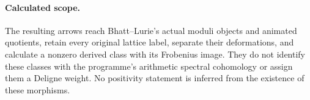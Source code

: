 \paragraph{Calculated scope.}
The resulting arrows reach Bhatt--Lurie's actual moduli
objects and animated quotients, retain every original lattice
label, separate their deformations, and calculate a nonzero
derived class with its Frobenius image. They do not identify
these classes with the programme's arithmetic spectral
cohomology or assign them a Deligne weight. No positivity
statement is inferred from the existence of these morphisms.
